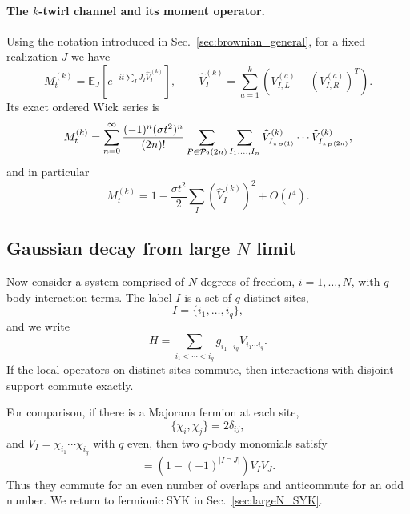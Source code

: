 \documentclass{article}
\theoremstyle{definition}
\begin{document}
\paragraph{The $k$-twirl channel and its moment operator.}
Using the notation introduced in Sec.~\ref{sec:brownian_general}, for a fixed
realization $J$ we have
\begin{equation}
    M_t^{(k)}
    =\mathbb E_J\!\left[
       e^{-it\sum_IJ_I\widehat V_I^{(k)}}
    \right],
    \qquad
    \widehat V_I^{(k)}
    =\sum_{a=1}^k
      \left(V_{I,L}^{(a)}-(V_{I,R}^{(a)})^T\right).
\end{equation}
Its exact ordered Wick series is
\begin{equation}
    M_t^{(k)}
    =\sum_{n=0}^{\infty}
    \frac{(-1)^n(\sigma t^2)^n}{(2n)!}
    \sum_{P\in{\cal P}_2(2n)}
    \sum_{I_1,\ldots,I_n}
    \widehat V_{I_{\pi_P(1)}}^{(k)}\cdots
    \widehat V_{I_{\pi_P(2n)}}^{(k)},
\end{equation}
and in particular
\begin{equation}
    M_t^{(k)}
    =1-\frac{\sigma t^2}{2}
    \sum_I(\widehat V_I^{(k)})^2+O(t^4).
\end{equation}


\subsection{Gaussian decay from large $N$ limit}

Now consider a system comprised of $N$ degrees of freedom,
$i=1,\ldots,N$, with $q$-body interaction terms.  The label $I$ is a set
of $q$ distinct sites,
\begin{equation}
    I=\{i_1,\ldots,i_q\},
\end{equation}
and we write
\begin{equation}
    H
    =\sum_{i_1<\cdots<i_q}
    g_{i_1\cdots i_q}V_{i_1\cdots i_q}.
\end{equation}
If the local operators on distinct sites commute, then interactions with
disjoint support commute exactly.

For comparison, if there is a Majorana fermion at each site,
\begin{equation}
    \{\chi_i,\chi_j\}=2\delta_{ij},
\end{equation}
and $V_I=\chi_{i_1}\cdots\chi_{i_q}$ with $q$ even, then two $q$-body
monomials satisfy
\begin{equation}
    [V_I,V_J]
    =\left(1-(-1)^{|I\cap J|}\right)V_IV_J.
\end{equation}
Thus they commute for an even number of overlaps and anticommute for an odd
number.  We return to fermionic SYK in Sec.~\ref{sec:largeN_SYK}.
\end{document}
